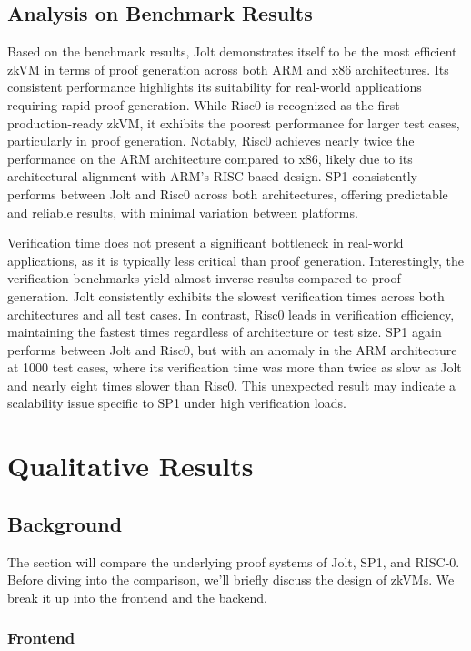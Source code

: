 \documentclass{scrartcl}
\begin{document}
\subsection{Analysis on Benchmark Results}

Based on the benchmark results, Jolt demonstrates itself to be the most efficient zkVM in terms of proof generation across both ARM and x86 architectures. Its consistent performance highlights its suitability for real-world applications requiring rapid proof generation. While Risc0 is recognized as the first production-ready zkVM, it exhibits the poorest performance for larger test cases, particularly in proof generation. Notably, Risc0 achieves nearly twice the performance on the ARM architecture compared to x86, likely due to its architectural alignment with ARM’s RISC-based design. SP1 consistently performs between Jolt and Risc0 across both architectures, offering predictable and reliable results, with minimal variation between platforms.

Verification time does not present a significant bottleneck in real-world applications, as it is typically less critical than proof generation. Interestingly, the verification benchmarks yield almost inverse results compared to proof generation. Jolt consistently exhibits the slowest verification times across both architectures and all test cases. In contrast, Risc0 leads in verification efficiency, maintaining the fastest times regardless of architecture or test size. SP1 again performs between Jolt and Risc0, but with an anomaly in the ARM architecture at 1000 test cases, where its verification time was more than twice as slow as Jolt and nearly eight times slower than Risc0. This unexpected result may indicate a scalability issue specific to SP1 under high verification loads.

\section{Qualitative Results}

\subsection{Background}

The section will compare the underlying proof systems of Jolt, SP1, and RISC-0. Before diving into the comparison, we'll briefly discuss the design of zkVMs. We break it up into the frontend and the backend.

\subsubsection{Frontend}
\end{document}
